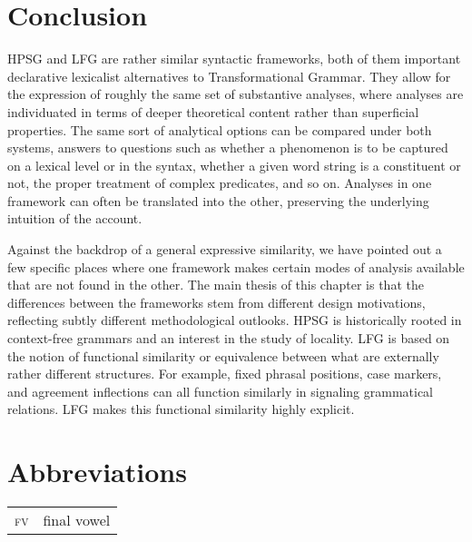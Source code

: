 \section{Conclusion}

HPSG and LFG  are rather similar syntactic frameworks, both of them important declarative lexicalist alternatives to Transformational Grammar.  They allow for the expression of roughly the same set of substantive analyses, where analyses are individuated in terms of deeper theoretical content rather than superficial properties.  The same sort of analytical options can be compared under both systems, answers to questions such as whether a phenomenon is to be captured on a lexical level or in the syntax, whether a given word string is a constituent or not, the proper treatment of complex predicates, and so on.   Analyses in one framework can often be translated into the other, preserving the underlying intuition of the account.   %

Against the backdrop of a general expressive similarity, we have pointed out a few specific places where one framework makes certain modes of analysis available that are not found in the other.   The main thesis of this chapter is that the differences between the frameworks stem from different design motivations, reflecting subtly different methodological outlooks.  HPSG is historically rooted in context-free grammars and an interest in the study of locality.  LFG is based on the notion of functional similarity or equivalence between what are externally rather different structures. For example, fixed phrasal positions, case markers, and agreement inflections can all function similarly in signaling grammatical relations.  LFG makes this  functional similarity highly explicit.
 
\section*{Abbreviations}

\begin{tabularx}{.99\textwidth}{@{}lX}
\textsc{fv} & final vowel\\
\end{tabularx}

